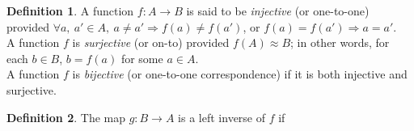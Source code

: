 \documentclass[a4paper,sfsidenotes,openany]{tufte-book}
\theoremstyle{definition}
\newtheorem{definition}{Definition}[section]
\begin{document}
\begin{fullwidth}
\begin{definition}
A function $ f: A \rightarrow B$ is said to be \textit{{\color{blue} injective}} (or one-to-one) provided $ \forall a, \ a' \in A, \ a \neq a' \Rightarrow f(a) \neq f(a') $, or $ f(a) = f(a') \Rightarrow a = a'  $.\\
A function $ f $ is \textit{{\color{blue} surjective}} (or on-to) provided $ f(A) \approx B $; in other words, for each $ b \in B $, $ b=f(a) $ for some $ a \in A $.\\
A function $ f $ is \textit{{\color{blue} bijective}} (or one-to-one correspondence) if it is both injective and surjective.\\
\end{definition}
\>

\begin{definition}
The map $ g: B \rightarrow A $ is a left inverse of $ f $ if 

\end{definition}
\>


\end{fullwidth}




\printindex
\end{document}
